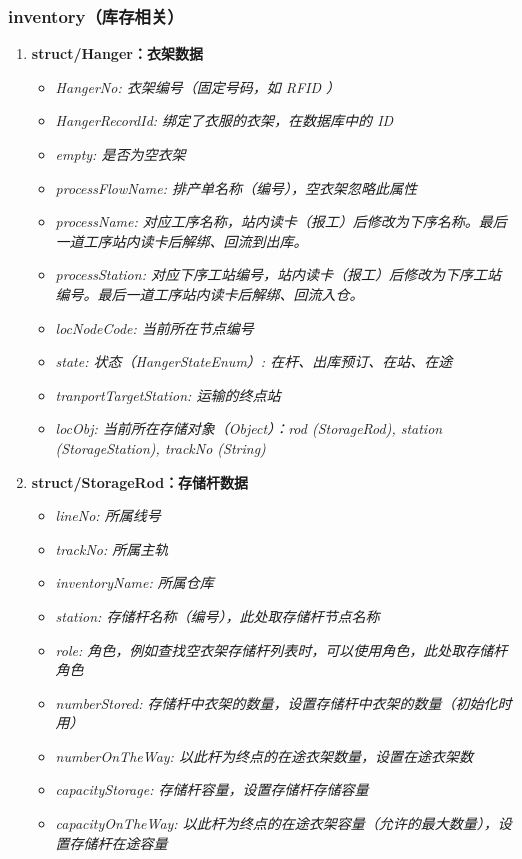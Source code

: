\subsubsection{inventory（库存相关）}
	\begin{enumerate}[label=\arabic*)]
		\item \bf{struct/Hanger}：衣架数据
		\begin{itemize}
			\item \it{HangerNo}: 衣架编号（固定号码，如 RFID ）
			\item \it{HangerRecordId}: 绑定了衣服的衣架，在数据库中的 ID
			\item \it{empty}: 是否为空衣架
			\item \it{processFlowName}: 排产单名称（编号），空衣架忽略此属性
			\item \it{processName}: 对应工序名称，站内读卡（报工）后修改为下序名称。最后一道工序站内读卡后解绑、回流到出库。
			\item \it{processStation}: 对应下序工站编号，站内读卡（报工）后修改为下序工站编号。最后一道工序站内读卡后解绑、回流入仓。
			\item \it{locNodeCode}: 当前所在节点编号
			\item \it{state}: 状态（HangerStateEnum）: 在杆、出库预订、在站、在途
			\item \it{tranportTargetStation}: 运输的终点站
			\item \it{locObj}: 当前所在存储对象（Object）：rod (StorageRod), station (StorageStation), trackNo (String)
		\end{itemize}
		\item \bf{struct/StorageRod}：存储杆数据\label{sec:param-storageRod}
		\begin{itemize}
			\item \it{lineNo}: 所属线号
			\item \it{trackNo}: 所属主轨
			\item \it{inventoryName}: 所属仓库
			\item \it{station}: 存储杆名称（编号），此处取存储杆节点名称
			\item \it{role}: 角色，例如查找空衣架存储杆列表时，可以使用角色，此处取存储杆角色
			\item \it{numberStored}: 存储杆中衣架的数量，设置存储杆中衣架的数量（初始化时用）
			\item \it{numberOnTheWay}: 以此杆为终点的在途衣架数量，设置在途衣架数
			\item \it{capacityStorage}: 存储杆容量，设置存储杆存储容量
			\item \it{capacityOnTheWay}: 以此杆为终点的在途衣架容量（允许的最大数量），设置存储杆在途容量

\end{itemize}
\end{enumerate}
